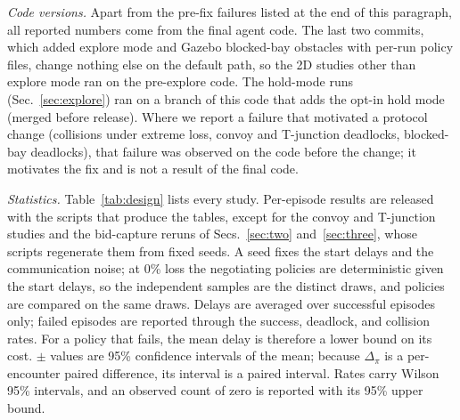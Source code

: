 \documentclass[letterpaper,journal]{IEEEtran}
\begin{document}
\emph{Code versions.} Apart from the pre-fix failures listed at the end of this paragraph, all reported numbers come from the final agent code. The last two commits, which added explore mode and Gazebo blocked-bay obstacles with per-run policy files, change nothing else on the default path, so the 2D studies other than explore mode ran on the pre-explore code. The hold-mode runs (Sec.~\ref{sec:explore}) ran on a branch of this code that adds the opt-in hold mode (merged before release). %
Where we report a failure that motivated a protocol change (collisions under extreme loss, convoy and T-junction deadlocks, blocked-bay deadlocks), that failure was observed on the code before the change; it motivates the fix and is not a result of the final code.

\emph{Statistics.} Table~\ref{tab:design} lists every study. Per-episode results are released with the scripts that produce the tables, except for the convoy and T-junction studies and the bid-capture reruns of Secs.~\ref{sec:two} and~\ref{sec:three}, whose scripts regenerate them from fixed seeds. %
A seed fixes the start delays and the communication noise; at 0\% loss the negotiating policies are deterministic given the start delays, so the independent samples are the distinct draws, and policies are compared on the same draws. Delays are averaged over successful episodes only; failed episodes are reported through the success, deadlock, and collision rates. For a policy that fails, the mean delay is therefore a lower bound on its cost. $\pm$ values are 95\% confidence intervals of the mean; because $\Delta_\pi$ is a per-encounter paired difference, its interval is a paired interval. Rates carry Wilson 95\% intervals, and an observed count of zero is reported with its 95\% upper bound.
\end{document}
